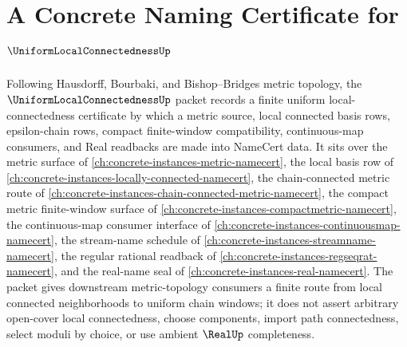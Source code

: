 \chapter{A Concrete Naming Certificate for $\UniformLocalConnectednessUp$}
\label{ch:concrete-instances-uniform-local-connectedness-namecert}

Following Hausdorff, Bourbaki, and Bishop--Bridges metric topology, the $\UniformLocalConnectednessUp$ packet records a finite uniform local-connectedness certificate by which a metric source, local connected basis rows, epsilon-chain rows, compact finite-window compatibility, continuous-map consumers, and Real readbacks are made into NameCert data. It sits over the metric surface of \autoref{ch:concrete-instances-metric-namecert}, the local basis row of \autoref{ch:concrete-instances-locally-connected-namecert}, the chain-connected metric route of \autoref{ch:concrete-instances-chain-connected-metric-namecert}, the compact metric finite-window surface of \autoref{ch:concrete-instances-compactmetric-namecert}, the continuous-map consumer interface of \autoref{ch:concrete-instances-continuousmap-namecert}, the stream-name schedule of \autoref{ch:concrete-instances-streamname-namecert}, the regular rational readback of \autoref{ch:concrete-instances-regseqrat-namecert}, and the real-name seal of \autoref{ch:concrete-instances-real-namecert}. The packet gives downstream metric-topology consumers a finite route from local connected neighborhoods to uniform chain windows; it does not assert arbitrary open-cover local connectedness, choose components, import path connectedness, select moduli by choice, or use ambient $\RealUp$ completeness.

